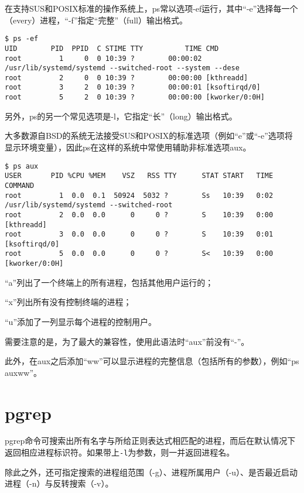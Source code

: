 在支持SUS和POSIX标准的操作系统上，ps常以选项-ef运行，其中“-e”选择每一个（every）进程，“-f”指定“完整”（full）输出格式。

\begin{verbatim}
$ ps -ef
UID        PID  PPID  C STIME TTY          TIME CMD
root         1     0  0 10:39 ?        00:00:02 /usr/lib/systemd/systemd --switched-root --system --dese
root         2     0  0 10:39 ?        00:00:00 [kthreadd]
root         3     2  0 10:39 ?        00:00:01 [ksoftirqd/0]
root         5     2  0 10:39 ?        00:00:00 [kworker/0:0H]
\end{verbatim}

另外，ps的另一个常见选项是-l，它指定“长”（long）输出格式。

大多数源自BSD的系统无法接受SUS和POSIX的标准选项（例如“e”或“-e”选项将显示环境变量），因此ps在这样的系统中常使用辅助非标准选项aux。

\begin{verbatim}
$ ps aux
USER       PID %CPU %MEM    VSZ   RSS TTY      STAT START   TIME COMMAND
root         1  0.0  0.1  50924  5032 ?        Ss   10:39   0:02 /usr/lib/systemd/systemd --switched-root
root         2  0.0  0.0      0     0 ?        S    10:39   0:00 [kthreadd]
root         3  0.0  0.0      0     0 ?        S    10:39   0:01 [ksoftirqd/0]
root         5  0.0  0.0      0     0 ?        S<   10:39   0:00 [kworker/0:0H]
\end{verbatim}


\begin{compactitem}
\item “a”列出了一个终端上的所有进程，包括其他用户运行的；
\item “x”列出所有没有控制终端的进程；
\item “u”添加了一列显示每个进程的控制用户。
\end{compactitem}

需要注意的是，为了最大的兼容性，使用此语法时“aux”前没有“-”。

此外，在aux之后添加“ww”可以显示进程的完整信息（包括所有的参数），例如“ps auxww”。

\section{pgrep} 

pgrep命令可搜索出所有名字与所给正则表达式相匹配的进程，而后在默认情况下返回相应进程标识符。如果带上\texttt{-l}为参数，则一并返回进程名。

除此之外，还可指定搜索的进程组范围（-g）、进程所属用户（-u）、是否最近启动进程（-n）与反转搜索（-v）。






